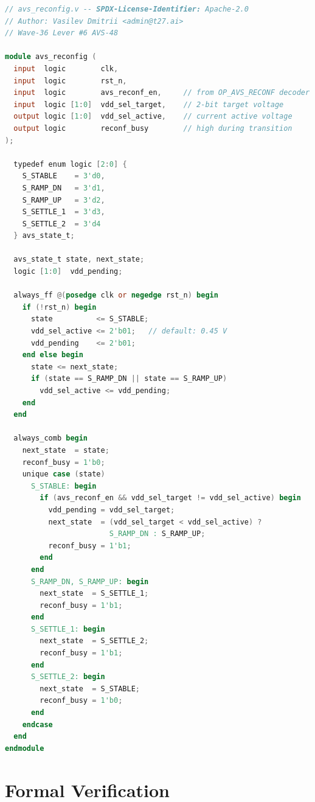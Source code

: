 \begin{lstlisting}[language=verilog, caption={RTL sketch: AVS-48 reconfiguration FSM}]
// avs_reconfig.v -- SPDX-License-Identifier: Apache-2.0
// Author: Vasilev Dmitrii <admin@t27.ai>
// Wave-36 Lever #6 AVS-48

module avs_reconfig (
  input  logic        clk,
  input  logic        rst_n,
  input  logic        avs_reconf_en,     // from OP_AVS_RECONF decoder
  input  logic [1:0]  vdd_sel_target,    // 2-bit target voltage
  output logic [1:0]  vdd_sel_active,    // current active voltage
  output logic        reconf_busy        // high during transition
);

  typedef enum logic [2:0] {
    S_STABLE    = 3'd0,
    S_RAMP_DN   = 3'd1,
    S_RAMP_UP   = 3'd2,
    S_SETTLE_1  = 3'd3,
    S_SETTLE_2  = 3'd4
  } avs_state_t;

  avs_state_t state, next_state;
  logic [1:0]  vdd_pending;

  always_ff @(posedge clk or negedge rst_n) begin
    if (!rst_n) begin
      state          <= S_STABLE;
      vdd_sel_active <= 2'b01;   // default: 0.45 V
      vdd_pending    <= 2'b01;
    end else begin
      state <= next_state;
      if (state == S_RAMP_DN || state == S_RAMP_UP)
        vdd_sel_active <= vdd_pending;
    end
  end

  always_comb begin
    next_state  = state;
    reconf_busy = 1'b0;
    unique case (state)
      S_STABLE: begin
        if (avs_reconf_en && vdd_sel_target != vdd_sel_active) begin
          vdd_pending = vdd_sel_target;
          next_state  = (vdd_sel_target < vdd_sel_active) ?
                        S_RAMP_DN : S_RAMP_UP;
          reconf_busy = 1'b1;
        end
      end
      S_RAMP_DN, S_RAMP_UP: begin
        next_state  = S_SETTLE_1;
        reconf_busy = 1'b1;
      end
      S_SETTLE_1: begin
        next_state  = S_SETTLE_2;
        reconf_busy = 1'b1;
      end
      S_SETTLE_2: begin
        next_state  = S_STABLE;
        reconf_busy = 1'b0;
      end
    endcase
  end
endmodule
\end{lstlisting}

\section{Formal Verification}
\label{sec:formal_verification}

